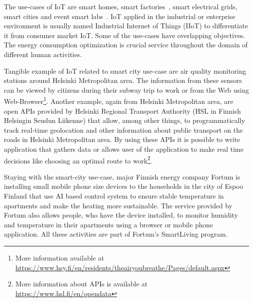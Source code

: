 \documentclass[english, 12pt, a4paper, elec, utf8, online]{aaltothesis}
\begin{document}
The use-cases of IoT are smart homes, smart factories~\cite{wang2016implementing}, smart electrical grids, smart cities and event smart labs~\cite{perkel2017internet}. IoT applied in the industrial or enterprise environment is usually named Industrial Internet of Things (IIoT) to differentiate it from consumer market IoT. Some of the use-cases have overlapping objectives. The energy consumption optimization is crucial service throughout the domain of different human activities.

Tangible example of IoT related to smart city use-case are air quality monitoring stations around Helsinki Metropolitan area. The information from these sensors can be viewed by citizens during their subway trip to work or from the Web using Web-Browser\footnote{More information available at \url{https://www.hsy.fi/en/residents/theairyoubreathe/Pages/default.aspx}}. Another example, again from Helsinki Metropolitan area, are open APIs provided by Helsinki Regional Transport Authority (HSL in Finnish Helsingin Seudun Liikenne) that allow, among other things, to programmatically track real-time geolocation and other information about public transport on the roads in Helsinki Metropolitan area. By using these APIs it is possible to write application that gathers data or allows user of the application to make real time decisions like choosing an optimal route to work\footnote{More information about APIs is available at \url{https://www.hsl.fi/en/opendata}}.  

Staying with the smart-city use-case, major Finnish energy company Fortum is installing small mobile phone size devices to the households in the city of Espoo Finland that use AI based control system to ensure stable temperature in apartments and make the heating more sustainable. The service provided by Fortum also allows people, who have the device installed, to monitor humidity and temperature in their apartments using a browser or mobile phone application. All these activities are part of Fortum's SmartLiving program.   
\end{document}

